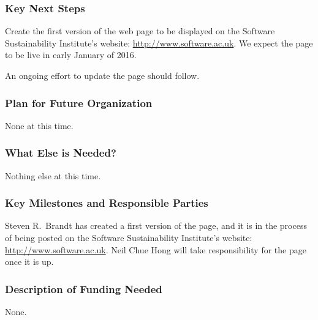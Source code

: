 \subsubsection{Key Next Steps}

Create the first version of the web page to be displayed on the Software
Sustainability Institute's website: \url{http://www.software.ac.uk}.
We expect the page to be live in early January of 2016.

An ongoing effort to update the page should follow.

\subsubsection{Plan for Future Organization}

None at this time.

\subsubsection{What Else is Needed?}

Nothing else at this time.

\subsubsection{Key Milestones and Responsible Parties}

Steven R.\ Brandt has created a first version of the page, and it is in the process
of being posted on the Software
Sustainability Institute's website: \url{http://www.software.ac.uk}. %
Neil Chue Hong will take responsibility for the page once it is up.

\subsubsection{Description of Funding Needed}

None.
